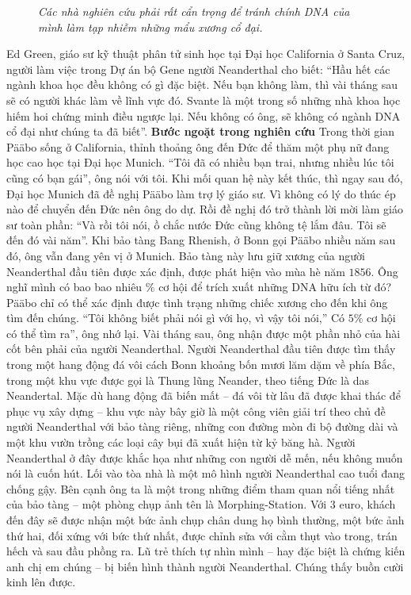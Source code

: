 \begin{multicols}{2}
\begin{figure}[H]
		\caption{\small\textit{\color{timhieukhoahoc}Các nhà nghiên cứu phải rất cẩn trọng để tránh chính DNA của mình làm tạp nhiễm những mẩu xương cổ đại.}}
		\vspace*{-10pt}
	\end{figure}
	Ed Green, giáo sư kỹ thuật phân tử sinh học tại Đại học California ở Santa Cruz, người làm việc trong Dự án bộ Gene người Neanderthal cho biết: “Hầu hết các ngành khoa học đều không có gì đặc biệt. Nếu bạn không làm, thì vài tháng sau sẽ có người khác làm về lĩnh vực đó. Svante là một trong số những nhà khoa học hiếm hoi chứng minh điều ngược lại. Nếu không có ông, sẽ không có ngành DNA cổ đại như chúng ta đã biết”.
	\vskip 0.1cm
	\textbf{\color{timhieukhoahoc}Bước ngoặt trong nghiên cứu}
	\vskip 0.1cm
	Trong thời gian Pääbo sống ở California, thỉnh thoảng ông đến Đức để thăm một phụ nữ đang học cao học tại Đại học Munich. “Tôi đã có nhiều bạn trai, nhưng nhiều lúc tôi cũng có bạn gái”, ông nói với tôi. Khi mối quan hệ này kết thúc, thì ngay sau đó, Đại học Munich đã đề nghị Pääbo làm trợ lý giáo sư. Vì không có lý do thúc ép nào để chuyển đến Đức nên ông do dự. Rồi đề nghị đó trở thành lời mời làm giáo sư toàn phần: “Và rồi tôi nói, ồ chắc nước Đức cũng không tệ lắm đâu. Tôi sẽ đến đó vài năm”.
	\vskip 0.1cm
	Khi bảo tàng Bang Rhenish, ở Bonn gọi Pääbo nhiều năm sau đó, ông vẫn đang yên vị ở Munich. Bảo tàng này lưu giữ xương của người Neanderthal đầu tiên được xác định, được phát hiện vào mùa hè năm $1856$. Ông nghĩ mình có bao bao nhiêu $\%$ cơ hội để trích xuất những DNA hữu ích từ đó? Pääbo chỉ có thể xác định được tình trạng những chiếc xương cho đến khi ông tìm đến chúng.
	\vskip 0.1cm
	“Tôi không biết phải nói gì với họ, vì vậy tôi nói,” Có $5\%$ cơ hội có thể tìm ra”, ông nhớ lại. Vài tháng sau, ông nhận được một phần nhỏ của hài cốt bên phải của người Neanderthal.
	\vskip 0.1cm
	Người Neanderthal đầu tiên được tìm thấy trong một hang động đá vôi cách Bonn khoảng bốn mươi lăm dặm về phía Bắc, trong một khu vực được gọi là Thung lũng Neander, theo tiếng Đức là das Neandertal. Mặc dù hang động đã biến mất -- đá vôi từ lâu đã được khai thác để phục vụ xây dựng -- khu vực này bây giờ là một công viên giải trí theo chủ đề người Neanderthal với bảo tàng riêng, những con đường mòn đi bộ đường dài và một khu vườn trồng các loại cây bụi đã xuất hiện từ kỷ băng hà. Người Neanderthal ở đây được khắc họa như những con người dễ mến, nếu không muốn nói là cuốn hút. Lối vào tòa nhà là một mô hình người Neanderthal cao tuổi đang chống gậy. Bên cạnh ông ta là một trong những điểm tham quan nổi tiếng nhất của bảo tàng -- một phòng chụp ảnh tên là Morphing-Station. Với $3$ euro, khách đến đây sẽ được nhận một bức ảnh chụp chân dung họ bình thường, một bức ảnh thứ hai, đối xứng với bức thứ nhất, được chỉnh sửa với cằm thụt vào trong, trán hếch và sau đầu phồng ra. Lũ trẻ thích tự nhìn mình -- hay đặc biệt là chứng kiến anh chị em chúng -- bị biến hình thành người Neanderthal. Chúng thấy buồn cười kinh lên được.

\end{multicols}
